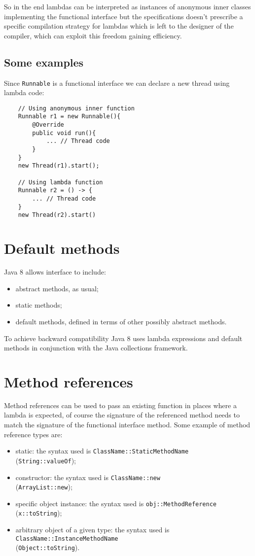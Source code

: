 So in the end lambdas can be interpreted as instances of anonymous inner classes implementing the functional interface but the specifications doesn't prescribe a specific compilation strategy for lambdas which is left to the designer of the compiler, which can exploit this freedom gaining efficiency.

\subsection{Some examples}
Since \verb|Runnable| is a functional interface we can declare a new thread using lambda code:
\begin{verbatim}
    // Using anonymous inner function
    Runnable r1 = new Runnable(){
        @Override
        public void run(){
            ... // Thread code
        }
    }
    new Thread(r1).start();

    // Using lambda function
    Runnable r2 = () -> {
        ... // Thread code
    }
    new Thread(r2).start()
\end{verbatim}

\section{Default methods}
Java 8 allows interface to include:
\begin{itemize}
    \item abstract methods, as usual;
    \item static methods;
    \item default methods, defined in terms of other possibly abstract methods.
\end{itemize}
To achieve backward compatibility Java 8 uses lambda expressions and default methods in conjunction with the Java collections framework.

\section{Method references}
Method references can be used to pass an existing function in places where a lambda is expected, of course the signature of the referenced method needs to match the signature of the functional interface method.
Some example of method reference types are:
\begin{itemize}
    \item static: the syntax used is \verb|ClassName::StaticMethodName| \\
    (\verb|String::valueOf|);
    \item constructor: the syntax used is \verb|ClassName::new| \\
    (\verb|ArrayList::new|);
    \item specific object instance: the syntax used is \verb|obj::MethodReference| \\
    (\verb|x::toString|);
    \item arbitrary object of a given type: the syntax used is \verb|ClassName::InstanceMethodName| \\(\verb|Object::toString|).
\end{itemize}

